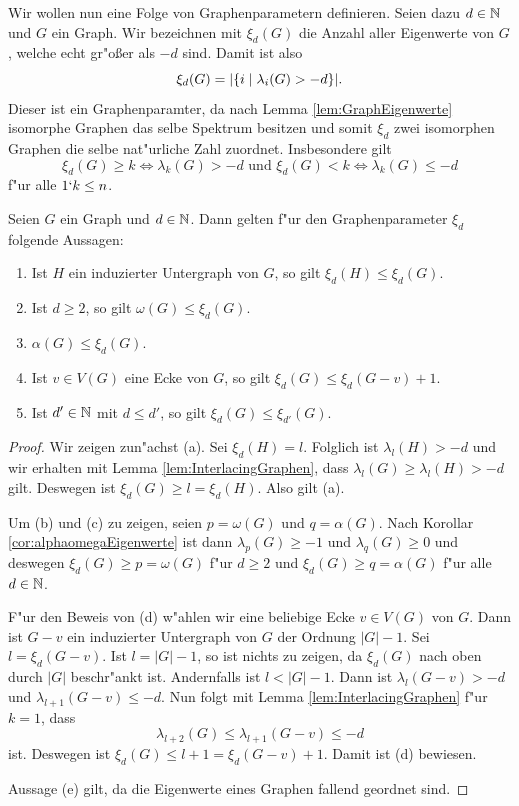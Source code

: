 Wir wollen nun eine Folge von Graphenparametern definieren. Seien dazu $d\in{\mathbb{N}}$ und $G$ ein Graph. Wir bezeichnen mit $\xi_{d}(G)$ die Anzahl aller Eigenwerte von $G$, welche echt gr"o{\ss}er als $-d$ sind. Damit ist also 
$$\xi_{d}(G) = |\{i \;|\; \lambda_i(G) > -d \}|.$$ 
Dieser ist ein Graphenparamter, da nach Lemma \ref{lem:GraphEigenwerte} isomorphe Graphen das selbe Spektrum besitzen und somit $\xi_d $ zwei isomorphen Graphen die selbe nat"urliche Zahl zuordnet. 
Insbesondere gilt
$$\xi_{d}(G) \geq k \Leftrightarrow \lambda_{k}(G) > -d \text{ und } \xi_{d}(G) < k \Leftrightarrow \lambda_{k}(G) \leq -d $$ f"ur alle $1 \lq k \leq n$.

\begin{lemma}
  Seien $G$ ein Graph und $d\in {\mathbb{N}}$. Dann gelten f"ur den Graphenparameter $\xi_d$ folgende Aussagen:
  \begin{enumerate}[label={\rm(\alph*)}]
    \item Ist $H$ ein induzierter Untergraph von $G$, so gilt $\xi_{d}(H) \leq \xi_{d}(G)$.
    \item Ist $d\geq 2$, so gilt $\omega(G) \leq \xi_{d}(G)$.
    \item $\alpha(G) \leq \xi_{d}(G)$. 
    \item Ist $v\in V(G)$ eine Ecke von $G$, so gilt $\xi_{d}(G) \leq \xi_{d}(G-v) +1$.
    \item Ist $d'\in{\mathbb{N}}$ mit $d \leq d'$, so gilt $\xi_{d}(G) \leq \xi_{d'}(G)$.
  \end{enumerate}
  \label{lem:xieigenschaften}
\end{lemma}

\begin{proof}
  Wir zeigen zun"achst (a). Sei $\xi_{d}(H) = l$. Folglich ist $\lambda_{l}(H) > -d$ und wir erhalten mit Lemma \ref{lem:InterlacingGraphen}, dass $\lambda_{l}(G) \geq \lambda_{l}(H) > -d$ gilt. Deswegen ist $\xi_{d}(G) \geq l = \xi_{d}(H)$. Also gilt (a).

  Um (b) und (c) zu zeigen, seien $p = \omega(G)$ und $q=\alpha(G)$. Nach Korollar \ref{cor:alphaomegaEigenwerte} ist dann $\lambda_{p}(G) \geq -1$ und $\lambda_q(G) \geq 0$ und deswegen $\xi_{d}(G) \geq p = \omega(G)$ f"ur $d \geq 2$ und $\xi_{d}(G) \geq q = \alpha(G)$ f"ur alle $d \in {\mathbb{N}}$. 

  F"ur den Beweis von (d) w"ahlen wir eine beliebige Ecke $v\in V(G)$ von $G$. Dann ist $G-v$ ein induzierter Untergraph von $G$ der Ordnung $|G|-1$. Sei $l=\xi_{d}(G-v)$. Ist $l= |G|-1$, so ist nichts zu zeigen, da $\xi_d(G)$ nach oben durch $|G|$ beschr"ankt ist. Andernfalls ist $l< |G| -1$. 
  Dann ist $\lambda_{l}(G-v) > -d$ und $\lambda_{l+1}(G-v) \leq -d$. Nun folgt mit Lemma \ref{lem:InterlacingGraphen} f"ur $k=1$, dass $$\lambda_{l+2}(G) \leq \lambda_{l+1}(G-v) \leq -d$$ ist. Deswegen ist $\xi_{d}(G) \leq l+1 = \xi_{d}(G-v) +1$. Damit ist (d) bewiesen.

  Aussage (e) gilt, da die Eigenwerte eines Graphen fallend geordnet sind.
\end{proof}

